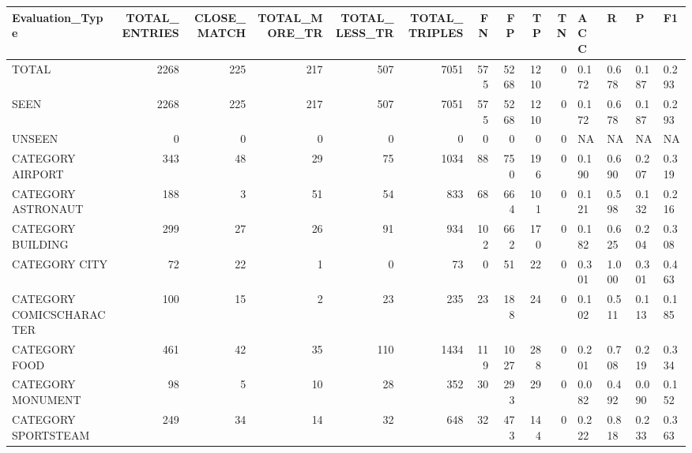\begin{tabular}{lrrrrrrrrrllll}
\hline
 Evaluation\_Type          &   TOTAL\_ENTRIES &   CLOSE\_MATCH &   TOTAL\_MORE\_TR &   TOTAL\_LESS\_TR &   TOTAL\_TRIPLES &   FN &   FP &   TP &   TN & ACC   & R     & P     & F1    \\
\hline
 TOTAL                    &            2268 &           225 &             217 &             507 &            7051 &  575 & 5268 & 1210 &    0 & 0.172 & 0.678 & 0.187 & 0.293 \\
 SEEN                     &            2268 &           225 &             217 &             507 &            7051 &  575 & 5268 & 1210 &    0 & 0.172 & 0.678 & 0.187 & 0.293 \\
 UNSEEN                   &               0 &             0 &               0 &               0 &               0 &    0 &    0 &    0 &    0 & NA    & NA    & NA    & NA    \\
 CATEGORY AIRPORT         &             343 &            48 &              29 &              75 &            1034 &   88 &  750 &  196 &    0 & 0.190 & 0.690 & 0.207 & 0.319 \\
 CATEGORY ASTRONAUT       &             188 &             3 &              51 &              54 &             833 &   68 &  664 &  101 &    0 & 0.121 & 0.598 & 0.132 & 0.216 \\
 CATEGORY BUILDING        &             299 &            27 &              26 &              91 &             934 &  102 &  662 &  170 &    0 & 0.182 & 0.625 & 0.204 & 0.308 \\
 CATEGORY CITY            &              72 &            22 &               1 &               0 &              73 &    0 &   51 &   22 &    0 & 0.301 & 1.000 & 0.301 & 0.463 \\
 CATEGORY COMICSCHARACTER &             100 &            15 &               2 &              23 &             235 &   23 &  188 &   24 &    0 & 0.102 & 0.511 & 0.113 & 0.185 \\
 CATEGORY FOOD            &             461 &            42 &              35 &             110 &            1434 &  119 & 1027 &  288 &    0 & 0.201 & 0.708 & 0.219 & 0.334 \\
 CATEGORY MONUMENT        &              98 &             5 &              10 &              28 &             352 &   30 &  293 &   29 &    0 & 0.082 & 0.492 & 0.090 & 0.152 \\
 CATEGORY SPORTSTEAM      &             249 &            34 &              14 &              32 &             648 &   32 &  473 &  144 &    0 & 0.222 & 0.818 & 0.233 & 0.363 \\

\end{tabular}
